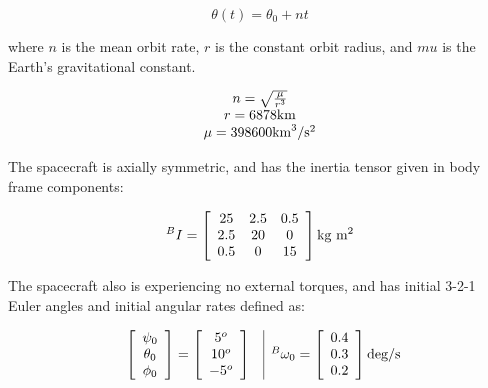 \documentclass[11pt]{aiaa-tc}%
\newcommand{\brackets} [1] {\left[ #1 \right]}
\newcommand{\arrayb}[2]{\brackets{ \begin{array}{#1}  #2 \end{array} } }
\begin{document}
\begin{equation}
	\theta(t) = \theta_0 + nt
	\label{eq:Theta(t)}
\end{equation} 

where $n$ is the mean orbit rate, $r$ is the constant orbit radius, and $mu$ is the Earth's gravitational constant. 

\begin{displaymath}
	\begin{array}{c}
		n=\sqrt{\frac{\mu}{r^3}}  						\\
		r = 6878 \textnormal{km}						\\
		\mu = 398600   \textnormal{km}^3/\textnormal{s}^2	\\
	\end{array}
\end{displaymath}

The spacecraft is axially symmetric, and has the inertia tensor given in body frame components:

\begin{displaymath}
^BI = 
	\arrayb{c c c}{
		 25  & 2.5 & 0.5	\\
		 2.5 & 20  &   0   \\
		 0.5 & 0    &   15  
	}
	\textnormal{kg m$^2$}
\end{displaymath}

The spacecraft also is experiencing no external torques, and has initial 3-2-1 Euler angles and initial angular rates defined as:

\begin{displaymath}
	\begin{array}{c | c}
		\begin{array}{c c}
			\arrayb{c}{
			\psi_0 	\\ 	\theta_0 		\\ \phi_0
			}
			=
			\arrayb{c}{
			5^o	\\ 	10^o		\\ -5^o
			}
		\end{array}
		&
		^B\omega_0 	=
			\arrayb{c}{
			0.4 	\\ 	0.3	\\  0.2
			}  \textnormal{deg/s}
	\end{array}
\end{displaymath}
\end{document}
